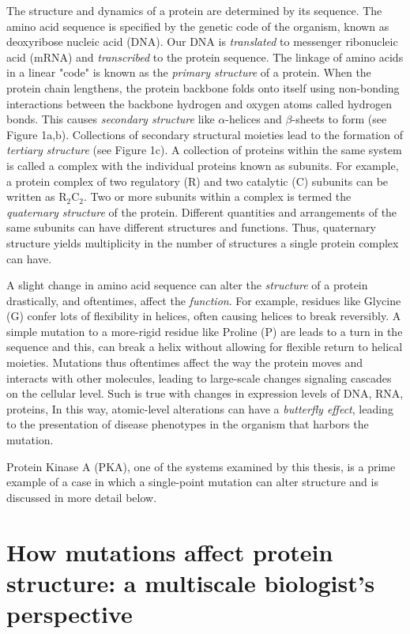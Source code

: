 \documentclass[12pt]{ucsddissertation}
\begin{document}
\begin{dissertationintroduction}
The structure and dynamics of a protein are determined by its sequence. The amino acid sequence is specified by the genetic code of the organism, known as deoxyribose nucleic acid (DNA). Our DNA is \textit{translated} to messenger ribonucleic acid (mRNA) and \textit{transcribed} to the protein sequence. The linkage of amino acids in a linear "code" is known as the \textit{primary structure} of a protein. When the protein chain lengthens, the protein backbone folds onto itself using non-bonding interactions between the backbone hydrogen and oxygen atoms called hydrogen bonds. This causes \textit{secondary structure} like $\alpha$-helices and $\beta$-sheets to form (see Figure 1a,b). Collections of secondary structural moieties lead to the formation of \textit{tertiary structure} (see Figure 1c). A collection of proteins within the same system is called a complex with the individual proteins known as subunits. For example, a protein complex of two regulatory (R) and two catalytic (C) subunits can be written as R$_{2}$C$_{2}$. Two or more subunits within a complex is termed the \textit{quaternary structure} of the protein. Different quantities and arrangements of the same subunits can have different structures and functions. Thus, quaternary structure yields multiplicity in the number of structures a single protein complex can have. 

A slight change in amino acid sequence can alter the \textit{structure} of a protein drastically, and oftentimes, affect the \textit{function}. For example, residues like Glycine (G) confer lots of flexibility in helices, often causing helices to break reversibly. A simple mutation to a more-rigid residue like Proline (P) are leads to a turn in the sequence and this, can break a helix without allowing for flexible return to helical moieties. Mutations thus oftentimes affect the way the protein moves and interacts with other molecules, leading to large-scale changes signaling cascades on the cellular level. Such is true with changes in expression levels of DNA, RNA, proteins, In this way, atomic-level alterations can have a \textit{butterfly effect}, leading to the presentation of disease phenotypes in the organism that harbors the mutation. 

Protein Kinase A (PKA), one of the systems examined by this thesis, is a prime example of a case in which a single-point mutation can alter structure and is discussed in more detail below.

\section{How mutations affect protein structure: a multiscale biologist's perspective}


\end{dissertationintroduction}
\end{document}
